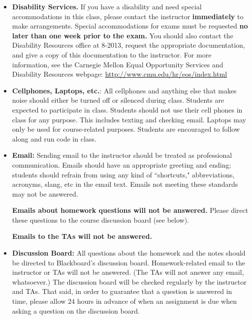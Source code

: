 \documentclass[11pt]{article}
\begin{document}
\begin{itemize}
\item {\bf Disability Services.}  If you have a disability and need special accommodations in this class, please contact the instructor {\bf immediately} to make arrangements.  Special accommodations for exams must be requested {\bf no later than one week prior to the exam.}  You should also contact the Disability Resources office at 8-2013, request the appropriate documentation, and give a copy of this documentation to the instructor.  For more information, see the Carnegie Mellon Equal Opportunity Services and Disability Resources webpage:  \url{http://www.cmu.edu/hr/eos/index.html}


\item {\bf Cellphones, Laptops, etc.}:  All cellphones and anything else that makes noise should either be turned off or silenced during class.  Students are expected to participate in class.  Students should not use their cell phones in class for any purpose.  This includes texting and checking email.  Laptops may only be used for course-related purposes.  Students are encouraged to follow along and run code in class.

\item {\bf Email:}  Sending email to the instructor should be treated as professional communication.  Emails should have an appropriate greeting and ending; students should refrain from using any kind of ``shortcuts," abbreviations, acronyms, slang, etc in the email text.  Emails not meeting these standards may not be answered.

\textbf{Emails about homework questions will not be answered.}  Please direct these questions to the course discussion board (see below).
	
\textbf{Emails to the TAs will not be answered.}


\item {\bf Discussion Board:}  All questions about the homework and the notes should be directed to Blackboard's discussion board.  Homework-related email to the instructor or TAs will not be answered.  (The TAs will not answer any email, whatsoever.)  The discussion board will be checked regularly by the instructor and TAs.  That said, in order to guarantee that a question is answered in time, please allow 24 hours in advance of when an assignment is due when asking a question on the discussion board.


\end{itemize}
\end{document}
